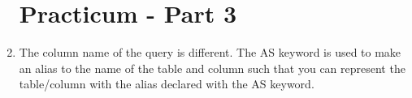 \documentclass[12pt,titlepage]{article}
\begin{document}
\begin{enumerate}
    \section*{Practicum - Part 3}
    \item The column name of the query is different. The AS keyword is used to make an alias to the name of the table and column such that you can represent the table/column with the alias declared with the AS keyword. \\
    \newpage

\end{enumerate}
\end{document}

